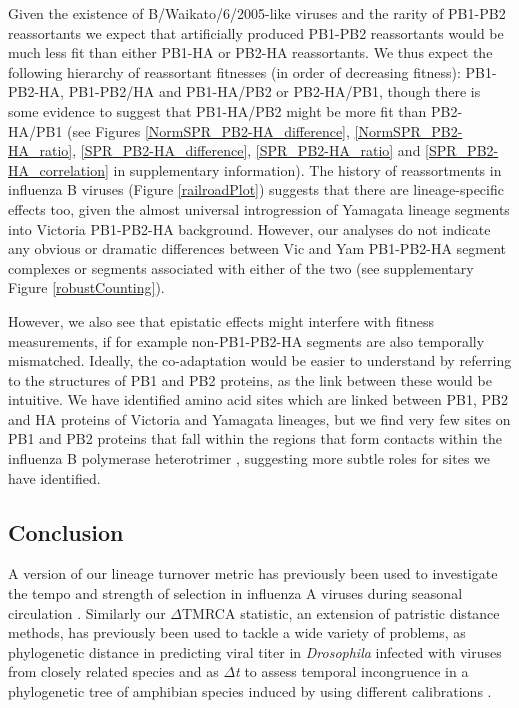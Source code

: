 \documentclass[11pt,oneside,letterpaper]{article}
\begin{document}
Given the existence of B/Waikato/6/2005-like viruses and the rarity of PB1-PB2 reassortants we expect that artificially produced PB1-PB2 reassortants would be much less fit than either PB1-HA or PB2-HA reassortants.
We thus expect the following hierarchy of reassortant fitnesses (in order of decreasing fitness): PB1-PB2-HA, PB1-PB2/HA and PB1-HA/PB2 or PB2-HA/PB1, though there is some evidence to suggest that PB1-HA/PB2 might be more fit than PB2-HA/PB1 (see Figures \ref{NormSPR_PB2-HA_difference}, \ref{NormSPR_PB2-HA_ratio}, \ref{SPR_PB2-HA_difference}, \ref{SPR_PB2-HA_ratio} and \ref{SPR_PB2-HA_correlation} in supplementary information).
The history of reassortments in influenza B viruses (Figure \ref{railroadPlot}) suggests that there are lineage-specific effects too, given the almost universal introgression of Yamagata lineage segments into Victoria PB1-PB2-HA background.
However, our analyses do not indicate any obvious or dramatic differences between Vic and Yam PB1-PB2-HA segment complexes or segments associated with either of the two (see supplementary Figure \ref{robustCounting}).

However, we also see that epistatic effects might interfere with fitness measurements, if for example non-PB1-PB2-HA segments are also temporally mismatched.
Ideally, the co-adaptation would be easier to understand by referring to the structures of PB1 and PB2 proteins, as the link between these would be intuitive.
We have identified amino acid sites which are linked between PB1, PB2 and HA proteins of Victoria and Yamagata lineages, but we find very few sites on PB1 and PB2 proteins that fall within the regions that form contacts within the influenza B polymerase heterotrimer \cite{sugiyama2009}, suggesting more subtle roles for sites we have identified.

\subsection*{Conclusion}
A version of our lineage turnover metric has previously been used to investigate the tempo and strength of selection in influenza A viruses during seasonal circulation \cite{bedford2011}.
Similarly our $\Delta$TMRCA statistic, an extension of patristic distance methods, has previously been used to tackle a wide variety of problems, as phylogenetic distance in predicting viral titer in \textit{Drosophila} infected with viruses from closely related species \cite{longdon2011} and as \textit{$\Delta$t} to assess temporal incongruence in a phylogenetic tree of amphibian species induced by using different calibrations \cite{ruane2011}.
\end{document}
